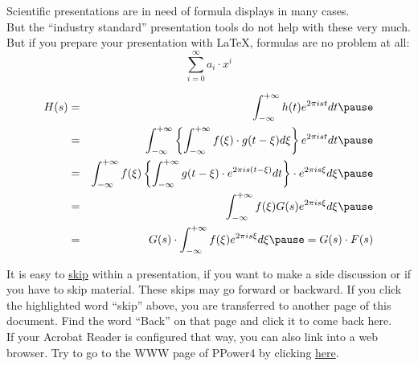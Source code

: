 \documentclass[30pt,landscape]{foils}
\begin{document}
\hypersetup{pdfpagetransition=R}
Scientific presentations are in need of formula displays in many cases.\pause\\
But the ``industry standard'' presentation tools do not help with
these very much.\pause\\
But if you prepare your presentation with \LaTeX{}, formulas are no
problem at all:
$$
  \sum_{i=0}^\infty a_i\cdot x^i
$$

\begin{eqnarray*}
H(s) &=& \int_{-\infty}^{+\infty} h(t) e^{2\pi ist} dt\pause\\
     &=& \int_{-\infty}^{+\infty} \left\{\int_{-\infty}^{+\infty}
         f(\xi) \cdot g(t - \xi) d \xi \right\} e^{2 \pi ist} dt\pause\\
     &=& \int_{- \infty}^{+ \infty} f(\xi) \left\{ \int_{- \infty}^{+
         \infty} g(t - \xi) \cdot e^{2\pi is(t - \xi)} dt\right\}
         \cdot e^{2\pi is \xi} d \xi\pause\\
     &=& \int_{- \infty}^{+ \infty} f(\xi) G(s) e^{2\pi is \xi} d \xi\pause\\
     &=& G(s) \cdot \int_{- \infty}^{+ \infty} f(\xi)e^{2\pi is \xi} d
         \xi\pause = G(s) \cdot F(s)
\end{eqnarray*}


It is easy to \hyperlink{Ende}{skip} within a presentation, if you
want to make a side discussion or if you have to skip material.
These skips may go forward or backward.
If you click the highlighted word "`skip"' above,
you are transferred to another page of this document. Find the word
 "`Back"' on that page and click it to come back here.\pause\\
If your Acrobat Reader is configured that way, you can also link into
a web browser. Try to go to the WWW page of PPower4 by clicking
\href{http://www-sp.iti.informatik.tu-darmstadt.de/software/ppower4/}{here}.
\end{document}
